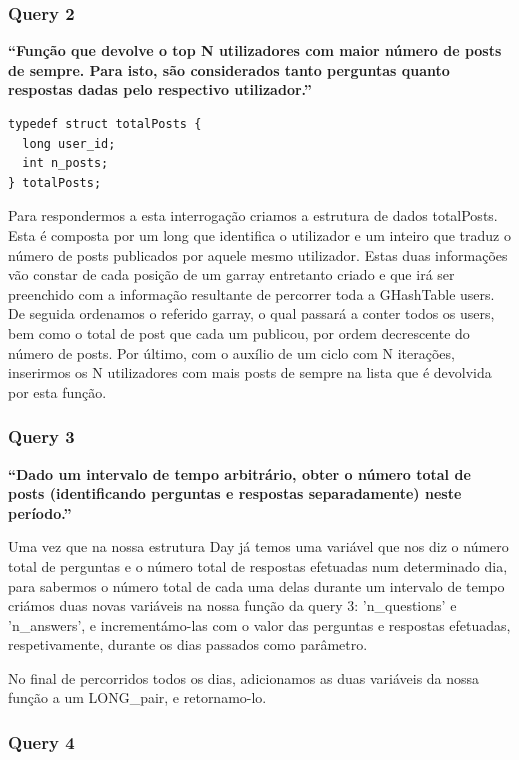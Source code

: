 \documentclass[a4paper]{article}
\begin{document}
\subsubsection*{Query 2}
\label{sec:query2}

\textbf{“Função que devolve o top N utilizadores com maior número
de posts de sempre. Para isto, são considerados tanto perguntas
quanto respostas dadas pelo respectivo utilizador.”}

\begin{verbatim}
typedef struct totalPosts {
  long user_id;
  int n_posts;
} totalPosts;
\end{verbatim}

Para respondermos a esta interrogação criamos a estrutura de dados
totalPosts. Esta é composta por um long que identifica o utilizador e um inteiro
que traduz o número de posts publicados por aquele mesmo utilizador.
Estas duas informações vão constar de cada posição de um garray entretanto criado
e que irá ser preenchido com a informação resultante de percorrer toda a GHashTable users.
De seguida ordenamos o referido garray, o qual passará a conter todos os users,
bem como o total de post que cada um publicou, por ordem decrescente do número de posts.
Por último, com o auxílio de um ciclo com N iterações, inserirmos os N utilizadores com
mais posts de sempre na lista que é devolvida por esta função.

\subsubsection*{Query 3}
\label{sec:query3}

\textbf{“Dado um intervalo de tempo arbitrário,
obter o número total de posts (identificando perguntas e respostas separadamente) neste período.”}

Uma vez que na nossa estrutura Day já temos uma variável que nos diz o número total de perguntas
e o número total de respostas efetuadas num determinado dia, para sabermos o
número total de cada uma delas durante um intervalo de tempo criámos duas novas
variáveis na nossa função da query 3: \textsf{'n\_questions'} e \textsf{'n\_answers'},
e incrementámo-las com o valor das perguntas e respostas efetuadas, respetivamente,
durante os dias passados como parâmetro.

No final de percorridos todos os dias, adicionamos as duas variáveis da nossa função a um LONG\_pair, e retornamo-lo.


\subsubsection*{Query 4}
\label{sec:query4}
\end{document}
